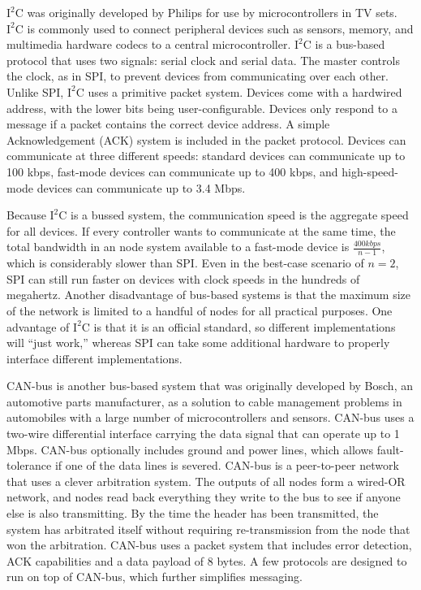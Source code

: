 $\textrm{I}^2 \textrm{C}$ was originally developed by Philips for use by microcontrollers in TV sets. $\textrm{I}^2 \textrm{C}$ is commonly used to connect peripheral devices such as sensors, memory, and multimedia hardware codecs to a central microcontroller. $\textrm{I}^2 \textrm{C}$ is a bus-based protocol that uses two signals: serial clock and serial data. The master controls the clock, as in SPI, to prevent devices from communicating over each other. Unlike SPI, $\textrm{I}^2 \textrm{C}$ uses a primitive packet system. Devices come with a hardwired address, with the lower bits being user-configurable. Devices only respond to a message if a packet contains the correct device address. A simple Acknowledgement (ACK) system is included in the packet protocol. Devices can communicate at three different speeds: standard devices can communicate up to 100 kbps, fast-mode devices can communicate up to 400 kbps, and high-speed-mode devices can communicate up to 3.4 Mbps. \cite{ref:2001-embedded.com-i2c} 

Because $\textrm{I}^2 \textrm{C}$ is a bussed system, the communication speed is the aggregate speed for all devices. If every controller wants to communicate at the same time, the total bandwidth in an  node system available to a fast-mode device is $\frac{400 kbps}{n - 1}$, which is considerably slower than SPI. Even in the best-case scenario of $n=2$, SPI can still run faster on devices with clock speeds in the hundreds of megahertz. Another disadvantage of bus-based systems is that the maximum size of the network is limited to a handful of nodes for all practical purposes. One advantage of $\textrm{I}^2 \textrm{C}$ is that it is an official standard, so different implementations will ``just work,'' whereas SPI can take some additional hardware to properly interface different implementations.

CAN-bus is another bus-based system that was originally developed by Bosch, an automotive parts manufacturer, as a solution to cable management problems in automobiles with a large number of microcontrollers and sensors. CAN-bus uses a two-wire differential interface carrying the data signal that can operate up to 1 Mbps. CAN-bus optionally includes ground and power lines, which allows fault-tolerance if one of the data lines is severed. CAN-bus is a peer-to-peer network that uses a clever arbitration system. The outputs of all nodes form a wired-OR network, and nodes read back everything they write to the bus to see if anyone else is also transmitting. By the time the header has been transmitted, the system has arbitrated itself without requiring re-transmission from the node that won the arbitration. CAN-bus uses a packet system that includes error detection, ACK capabilities and a data payload of 8 bytes. A few protocols are designed to run on top of CAN-bus, which further simplifies messaging. \cite{ref:2003-embedded.com-canbus}

